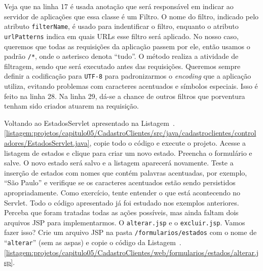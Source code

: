 
Veja que na linha 17 é usada anotação  que será responsável em indicar ao servidor de aplicações que essa classe é um Filtro. O nome do filtro, indicado pelo atributo \texttt{filterName}, é usado para indentificar o filtro, enquanto o atributo \texttt{urlPatterns} indica em quais URLs esse filtro será aplicado. No nosso caso, queremos que todas as requisições da aplicação passem por ele, então usamos o padrão \texttt{/*}, onde o asterisco denota ``tudo''. O método  realiza a atividade de filtragem, sendo que será executado antes das requisições. Queremos sempre definir a codificação para \texttt{UTF-8} para padronizarmos o \textit{encoding} que a aplicação utiliza, evitando problemas com caracteres acentuados e símbolos especiais. Isso é feito na linha 28. Na linha 29, dá-se a chance de outros filtros que porventura tenham sido criados atuarem na requisição.

Voltando ao EstadosServlet apresentado na Listagem~\thechapter.\ref{listagem:projetos/capitulo05/CadastroClientes/src/java/cadastroclientes/controladores/EstadosServlet.java}, copie todo o código e execute o projeto. Acesse a listagem de estados e clique para criar um novo estado. Preencha o formulário e salve. O novo estado será salvo e a listagem aparecerá novamente. Teste a inserção de estados com nomes que contém palavras acentuadas, por exemplo, ``São Paulo'' e verifique se os caracteres acentuados estão sendo persistidos apropriadamente. Como exercício, tente entender o que está acontecendo no Servlet. Todo o código apresentado já foi estudado nos exemplos anteriores. Perceba que foram tratadas todas as ações possíveis, mas ainda faltam dois arquivos JSP para implementarmos. O \texttt{alterar.jsp} e o \texttt{excluir.jsp}. Vamos fazer isso? Crie um arquivo JSP na pasta \texttt{/formularios/estados} com o nome de ``\texttt{alterar}'' (sem as aspas) e copie o código da Listagem~\thechapter.\ref{listagem:projetos/capitulo05/CadastroClientes/web/formularios/estados/alterar.jsp}.


